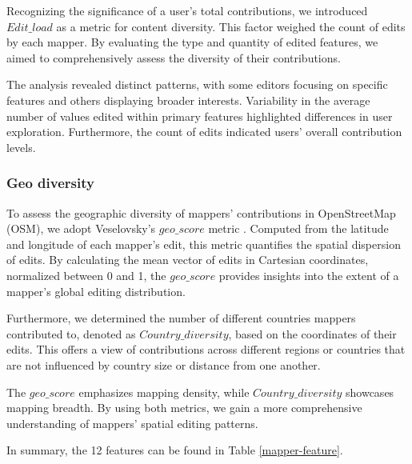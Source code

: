 \documentclass[manuscript,screen,review]{acmart}
\begin{document}
Recognizing the significance of a user's total contributions, we introduced $Edit\_load$ as a metric for content diversity. This factor weighed the count of edits by each mapper. By evaluating the type and quantity of edited features, we aimed to comprehensively assess the diversity of their contributions.

The analysis revealed distinct patterns, with some editors focusing on specific features and others displaying broader interests. Variability in the average number of values edited within primary features highlighted differences in user exploration. Furthermore, the count of edits indicated users' overall contribution levels. 

\subsubsection{Geo diversity}

To assess the geographic diversity of mappers' contributions in OpenStreetMap (OSM), we adopt Veselovsky's $geo\_score$ metric \cite{Veselovsky22}. Computed from the latitude and longitude of each mapper's edit, this metric quantifies the spatial dispersion of edits. By calculating the mean vector of edits in Cartesian coordinates, normalized between 0 and 1, the $geo\_score$ provides insights into the extent of a mapper's global editing distribution.

Furthermore, we determined the number of different countries mappers contributed to, denoted as $Country\_diversity$, based on the coordinates of their edits. This offers a view of contributions across different regions or countries that are not influenced by country size or distance from one another.

The $geo\_score$ emphasizes mapping density, while $Country\_diversity$ showcases mapping breadth. By using both metrics, we gain a more comprehensive understanding of mappers' spatial editing patterns.

In summary, the 12 features can be found in Table \ref{mapper-feature}.
\end{document}
